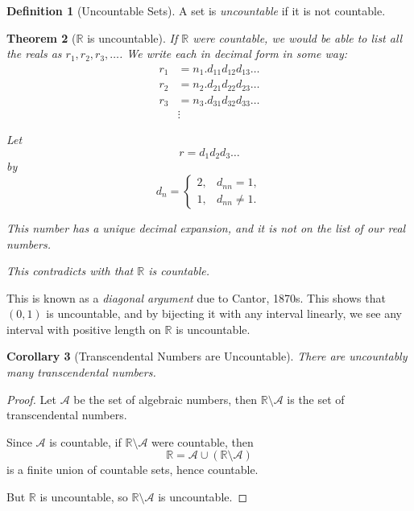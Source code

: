 \documentclass{article}
\newtheorem{theorem}{Theorem}[section]
\newtheorem{corollary}[theorem]{Corollary}
\theoremstyle{definition}
\newtheorem{definition}[theorem]{Definition}
\theoremstyle{remark}
\newcommand{\pqty}[1]{\left(#1\right)}
\newcommand{\oointv}[2]{(#1,#2)}
\newcommand{\RR}{\mathbb{R}}
\begin{document}
\begin{definition}[Uncountable Sets]
    A set is \emph{uncountable} if it is not countable.
\end{definition}

\begin{theorem}[\(\RR\) is uncountable]
    If \(\RR\) were countable, we would be able to list all the reals as \(r_1, r_2, r_3, \ldots\). We write each in decimal form in some way:
    \begin{align*}
        r_1 &= n_1.\boxed{d_{11}} d_{12} d_{13} \ldots \\
        r_2 &= n_2.d_{21} \boxed{d_{22}} d_{23} \ldots \\
        r_3 &= n_3.d_{31} d_{32} \boxed{d_{33}} \ldots \\
            & \vdots
    \end{align*}

    Let
    \[
        r = d_1 d_2 d_3 \ldots
    \]
    by
    \[
        d_n = \begin{cases}
            2, & d_{nn} = 1, \\
            1, & d_{nn} \neq 1.
        \end{cases}
    \]

    This number has a unique decimal expansion, and it is not on the list of our real numbers.

    This contradicts with that \(\RR\) is countable.
\end{theorem}

This is known as a \emph{diagonal argument} due to Cantor, 1870s. This shows that \(\oointv{0}{1}\) is uncountable, and by bijecting it with any interval linearly, we see any interval with positive length on \(\RR\) is uncountable.

\begin{corollary}[Transcendental Numbers are Uncountable]
    There are uncountably many transcendental numbers.
\end{corollary}

\begin{proof}
    Let \(\mathcal{A}\) be the set of algebraic numbers, then \(\RR \setminus \mathcal{A}\) is the set of transcendental numbers.

    Since \(\mathcal{A}\) is countable, if \(\RR \setminus \mathcal{A}\) were countable, then
    \[
        \RR = \mathcal{A} \cup \pqty{\RR \setminus \mathcal{A}}
    \]
    is a finite union of countable sets, hence countable.

    But \(\RR\) is uncountable, so \(\RR \setminus \mathcal{A}\) is uncountable.
\end{proof}
\end{document}
